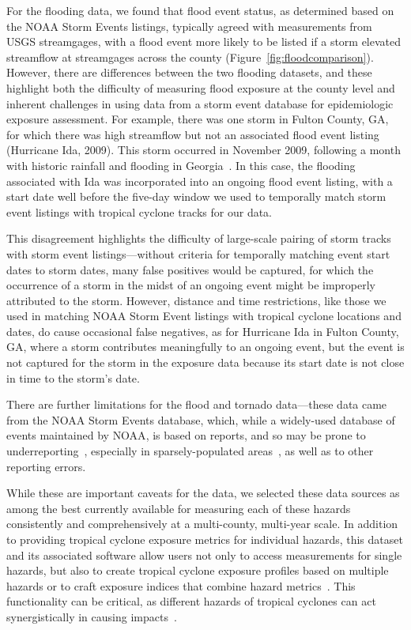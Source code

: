 For the flooding data, we found that flood event status, as determined based on
the NOAA Storm Events listings, typically agreed with measurements from
\ac{USGS} streamgages, with a flood event more likely to be listed if a storm
elevated streamflow at streamgages across the county
(Figure~\ref{fig:floodcomparison}).  However, there are differences between the
two flooding datasets, and these highlight both the difficulty of measuring
flood exposure at the county level and inherent challenges in using data from a
storm event database for epidemiologic exposure assessment.  For example, there
was one storm in Fulton County, GA, for which there was high streamflow but not
an associated flood event listing (Hurricane Ida, 2009).  This storm occurred
in November 2009, following a month with historic rainfall and flooding in
Georgia~\parencite{shepherd2011overview}.  In this case, the flooding
associated with Ida was incorporated into an ongoing flood event listing, with
a start date well before the five-day window we used to temporally match storm
event listings with tropical cyclone tracks for our data. 

This disagreement highlights the difficulty of large-scale pairing of storm
tracks with storm event listings---without criteria for temporally matching
event start dates to storm dates, many false positives would be
captured, for which the occurrence of a storm in the midst of an ongoing 
event might be improperly attributed to the storm.  However, distance
and time restrictions, like those we used in matching NOAA Storm Event listings
with tropical cyclone locations and dates, do cause 
occasional false negatives, as for Hurricane Ida in Fulton County, GA, where a
storm contributes meaningfully to an ongoing event, but the event is not
captured for the storm in the exposure data because its start date is not
close in time to the storm's date.  

There are further limitations for the flood and tornado data---these data came
from the \ac{NOAA} Storm Events database, which, while a widely-used database
of events maintained by \ac{NOAA}, is based on reports, and so may be prone to
underreporting~\parencite{Ashley2008flood, Curran2000}, especially in
sparsely-populated areas~\parencite{Witt1998, Ashley2007}, as well as to other
reporting errors. 

While these are important caveats for the data, we selected these data sources
as among the best currently available for measuring each of these hazards
consistently and comprehensively at a multi-county, multi-year scale. In
addition to providing tropical cyclone exposure metrics for individual hazards,
this dataset and its associated software allow users not only to access
measurements for single hazards, but also to create tropical cyclone exposure
profiles based on multiple hazards or to craft exposure indices that combine
hazard metrics~\parencite{chakraborty2005population, peduzzi2009assessing}.
This functionality can be critical, as different hazards of tropical cyclones can
act synergistically in causing impacts~\parencite{smith2009}.  


